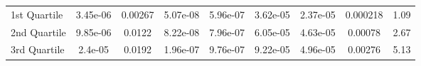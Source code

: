 {\begin{tabular} {lcccccccc}
\hspace{7pt}1st Quartile & \cellcolor{silver!60}3.45e-06 & \cellcolor{silver!60}0.00267 & \cellcolor{bronze!60}5.07e-08 & \cellcolor{bronze!60}5.96e-07 & \cellcolor{gold!60}3.62e-05 & \cellcolor{gold!60}2.37e-05 & \cellcolor{gold!60}0.000218 & \cellcolor{gold!60}1.09 \\ 
\hspace{7pt}2nd Quartile & \cellcolor{bronze!60}9.85e-06 & \cellcolor{bronze!60}0.0122 & \cellcolor{gold!60}8.22e-08 & \cellcolor{silver!60}7.96e-07 & \cellcolor{gold!60}6.05e-05 & \cellcolor{gold!60}4.63e-05 & \cellcolor{gold!60}0.00078 & \cellcolor{gold!60}2.67 \\ 
\hspace{7pt}3rd Quartile & \cellcolor{bronze!60}2.4e-05 & \cellcolor{silver!60}0.0192 & \cellcolor{silver!60}1.96e-07 & \cellcolor{silver!60}9.76e-07 & \cellcolor{gold!60}9.22e-05 & \cellcolor{gold!60}4.96e-05 & \cellcolor{gold!60}0.00276 & \cellcolor{gold!60}5.13 \\ 
\bottomrule
\end{tabular}}